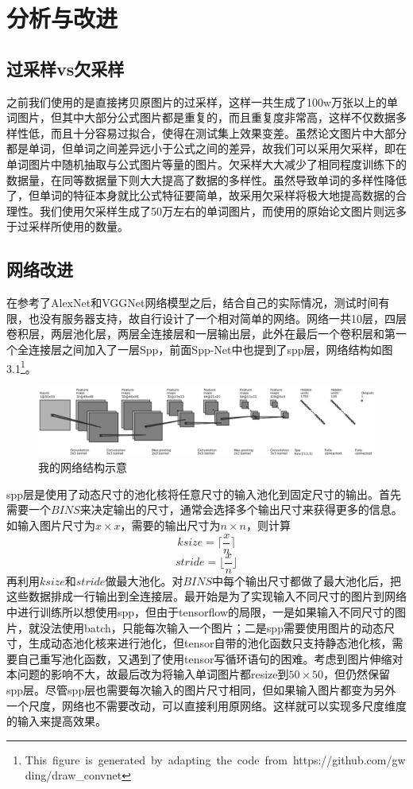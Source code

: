 \chapter{分析与改进}

\section{过采样vs欠采样}

之前我们使用的是直接拷贝原图片的过采样，这样一共生成了100w万张以上的单词图片，但其中大部分公式图片都是重复的，而且重复度非常高，这样不仅数据多样性低，而且十分容易过拟合，使得在测试集上效果变差。虽然论文图片中大部分都是单词，但单词之间差异远小于公式之间的差异，故我们可以采用欠采样，即在单词图片中随机抽取与公式图片等量的图片。欠采样大大减少了相同程度训练下的数据量，在同等数据量下则大大提高了数据的多样性。虽然导致单词的多样性降低了，但单词的特征本身就比公式特征要简单，故采用欠采样将极大地提高数据的合理性。我们使用欠采样生成了50万左右的单词图片，而使用的原始论文图片则远多于过采样所使用的数量。

\section{网络改进}
\noindent

在参考了AlexNet和VGGNet网络模型之后，结合自己的实际情况，测试时间有限，也没有服务器支持，故自行设计了一个相对简单的网络。网络一共10层，四层卷积层，两层池化层，两层全连接层和一层输出层，此外在最后一个卷积层和第一个全连接层之间加入了一层Spp，前面Spp-Net中也提到了spp层，网络结构如图3.1\footnote{\hbox{This figure is generated by adapting the code from https://github.com/gwding/draw\_convnet}}。
\begin{figure}[ht]
    \centering
    \hbox{\includegraphics[scale=0.5]{mynet.eps}}
    \caption{我的网络结构示意}
    \label{fig:label}
\end{figure}
spp层是使用了动态尺寸的池化核将任意尺寸的输入池化到固定尺寸的输出。首先需要一个$BINS$来决定输出的尺寸，通常会选择多个输出尺寸来获得更多的信息。如输入图片尺寸为$x \times x$，需要的输出尺寸为$n \times n$，则计算
$$ksize = \lceil \frac x n \rceil$$
$$stride = \lfloor \frac x n \rfloor$$
再利用$ksize$和$stride$做最大池化。对$BINS$中每个输出尺寸都做了最大池化后，把这些数据排成一行输出到全连接层。\cite{spp}最开始是为了实现输入不同尺寸的图片到网络中进行训练所以想使用spp，但由于tensorflow的局限，一是如果输入不同尺寸的图片，就没法使用batch，只能每次输入一个图片；二是spp需要使用图片的动态尺寸，生成动态池化核来进行池化，但tensor自带的池化函数只支持静态池化核，需要自己重写池化函数，又遇到了使用tensor写循环语句的困难。考虑到图片伸缩对本问题的影响不大，故最后改为将输入单词图片都resize到$50 \times 50$，但仍然保留spp层。尽管spp层也需要每次输入的图片尺寸相同，但如果输入图片都变为另外一个尺度，网络也不需要改动，可以直接利用原网络。这样就可以实现多尺度维度的输入来提高效果。

